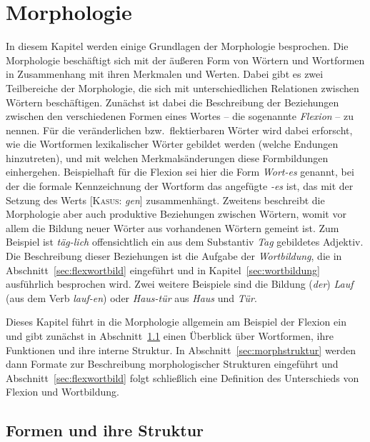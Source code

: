 \chapter{Morphologie}

\label{sec:morphologie}

In diesem Kapitel werden einige Grundlagen der Morphologie besprochen.
Die Morphologie beschäftigt sich mit der äußeren Form von Wörtern und Wortformen in Zusammenhang mit ihren Merkmalen und Werten.
Dabei gibt es zwei Teilbereiche der Morphologie, die sich mit unterschiedlichen Relationen zwischen Wörtern beschäftigen.
Zunächst ist dabei die Beschreibung der Beziehungen zwischen den verschiedenen Formen eines Wortes -- die sogenannte \textit{Flexion} -- zu nennen.
Für die veränderlichen bzw.\ flektierbaren Wörter wird dabei erforscht, wie die Wortformen lexikalischer Wörter gebildet werden (\zB welche Endungen hinzutreten), und mit welchen Merkmalsänderungen diese Formbildungen einhergehen.
Beispielhaft für die Flexion sei hier die Form \textit{Wort-es} genannt, bei der die formale Kennzeichnung der Wortform das angefügte \textit{-es} ist, das mit der Setzung des Werts [\textsc{Kasus}: \textit{gen}] zusammenhängt.
Zweitens beschreibt die Morphologie aber auch produktive Beziehungen zwischen Wörtern, womit vor allem die Bildung neuer Wörter aus vorhandenen Wörtern gemeint ist.
Zum Beispiel ist \textit{täg-lich} offensichtlich ein aus dem Substantiv \textit{Tag} gebildetes Adjektiv.
Die Beschreibung dieser Beziehungen ist die Aufgabe der \textit{Wortbildung}, die in Abschnitt~\ref{sec:flexwortbild} eingeführt und in Kapitel~\ref{sec:wortbildung} ausführlich besprochen wird.
Zwei weitere Beispiele sind die Bildung (\textit{der}) \textit{Lauf} (aus dem Verb \textit{lauf-en}) oder \textit{Haus-tür} aus \textit{Haus} und \textit{Tür}.

Dieses Kapitel führt in die Morphologie allgemein am Beispiel der Flexion ein und gibt zunächst in Abschnitt~\ref{sec:morphkond} einen Überblick über Wortformen, ihre Funktionen und ihre interne Struktur.
In Abschnitt~\ref{sec:morphstruktur} werden dann Formate zur Beschreibung morphologischer Strukturen eingeführt und Abschnitt~\ref{sec:flexwortbild} folgt schließlich eine Definition des Unterschieds von Flexion und Wortbildung.

\section{Formen und ihre Struktur}

\label{sec:morphkond}

